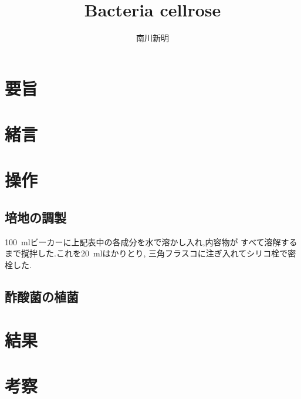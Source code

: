 \documentclass[uplatex, dvipdfmx, 10pt]{jarticle}
\title{{\huge Bacteria cellrose}}
\author{南川新明}
\begin{document}
            \begin{titlepage}
                \maketitle
                
            \end{titlepage}
        \section*{要旨}

        \section*{緒言}
            
        \section*{操作}
            \subsection*{培地の調製}
                \SI{100}{ml}ビーカーに上記表中の各成分を水で溶かし入れ,内容物が
                すべて溶解するまで撹拌した.これを\SI{20}{ml}はかりとり,
                三角フラスコに注ぎ入れてシリコ栓で密栓した.

            \subsection*{酢酸菌の植菌}
        \section*{結果}

        \section*{考察}

        
    
\end{document}
